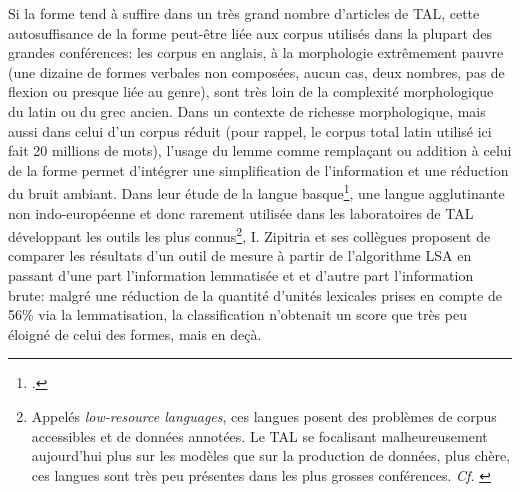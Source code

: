 Si la forme tend à suffire dans un très grand nombre d'articles de TAL, cette autosuffisance de la forme peut-être liée aux corpus utilisés dans la plupart des grandes conférences: les corpus en anglais, à la morphologie extrêmement pauvre (une dizaine de formes verbales non composées, aucun cas, deux nombres, pas de flexion ou presque liée au genre), sont très loin de la complexité morphologique du latin ou du grec ancien. Dans un contexte de richesse morphologique, mais aussi dans celui d'un corpus réduit (pour rappel, le corpus total latin utilisé ici fait 20 millions de mots), l'usage du lemme comme remplaçant ou addition à celui de la forme permet d'intégrer une simplification de l'information et une réduction du bruit ambiant. Dans leur étude de la langue basque\footcite{zipitria_observing_2006}, une langue agglutinante non indo-européenne et donc rarement utilisée dans les laboratoires de TAL développant les outils les plus connus\footnote{Appelés \textit{low-resource languages}, ces langues posent des problèmes de corpus accessibles et de données annotées. Le TAL se focalisant malheureusement aujourd'hui plus sur les modèles que sur la production de données, plus chère, ces langues sont très peu présentes dans les plus grosses conférences. \textit{Cf.} \cite{magueresse_low-resource_2020}}, I. Zipitria et ses collègues proposent de comparer les résultats d'un outil de mesure à partir de l'algorithme LSA en passant d'une part l'information lemmatisée et et d'autre part l'information brute: malgré une réduction de la quantité d'unités lexicales prises en compte de 56\% via la lemmatisation, la classification n'obtenait un score que très peu éloigné de celui des formes, mais en deçà. 

